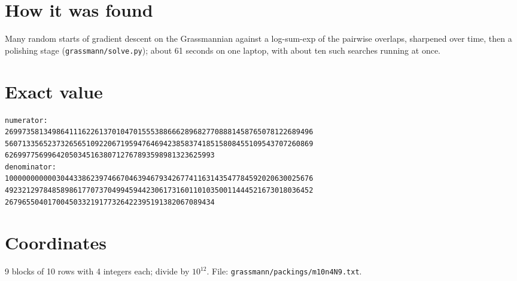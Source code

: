 \documentclass[11pt,a4paper]{article}
\begin{document}
\section{How it was found}
Many random starts of gradient descent on the Grassmannian against a log-sum-exp of the pairwise overlaps, sharpened over time, then a polishing stage (\texttt{grassmann/solve.py}); about 61 seconds on one laptop, with about ten such searches running at once.


\appendix
\section{Exact value}
{\small
\begin{verbatim}
numerator:
269973581349864111622613701047015553886662896827708881458765078122689496
560713356523732656510922067195947646942385837418515808455109543707260869
6269977569964205034516380712767893598981323625993
denominator:
100000000000304433862397466704639467934267741163143547784592020630025676
492321297848589861770737049945944230617316011010350011444521673018036452
2679655040170045033219177326422395191382067089434
\end{verbatim}}

\section{Coordinates}
9 blocks of 10 rows with 4 integers each; divide by $10^{12}$. File: \texttt{grassmann/packings/m10n4N9.txt}.
{\tiny
\begin{multicols}{3}
\end{multicols}}
\end{document}
